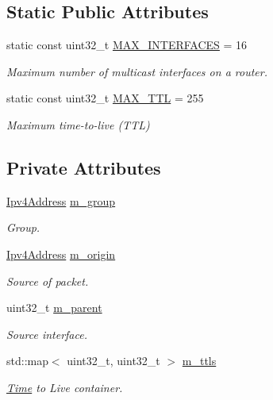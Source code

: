 \subsection*{Static Public Attributes}
\begin{DoxyCompactItemize}
\item 
static const uint32\+\_\+t \hyperlink{classns3_1_1Ipv4MulticastRoute_a9695fa6d0caa266aa4ab3b5cd2d86267}{M\+A\+X\+\_\+\+I\+N\+T\+E\+R\+F\+A\+C\+ES} = 16
\begin{DoxyCompactList}\small\item\em Maximum number of multicast interfaces on a router. \end{DoxyCompactList}\item 
static const uint32\+\_\+t \hyperlink{classns3_1_1Ipv4MulticastRoute_ab7118310b9ac11a437788db9c1250412}{M\+A\+X\+\_\+\+T\+TL} = 255
\begin{DoxyCompactList}\small\item\em Maximum time-\/to-\/live (T\+TL) \end{DoxyCompactList}\end{DoxyCompactItemize}
\subsection*{Private Attributes}
\begin{DoxyCompactItemize}
\item 
\hyperlink{classns3_1_1Ipv4Address}{Ipv4\+Address} \hyperlink{classns3_1_1Ipv4MulticastRoute_a1eff91a957a155f30f907dd41fcdd1a2}{m\+\_\+group}
\begin{DoxyCompactList}\small\item\em Group. \end{DoxyCompactList}\item 
\hyperlink{classns3_1_1Ipv4Address}{Ipv4\+Address} \hyperlink{classns3_1_1Ipv4MulticastRoute_a86aaae8111723a94b51f3bbff7bb16d1}{m\+\_\+origin}
\begin{DoxyCompactList}\small\item\em Source of packet. \end{DoxyCompactList}\item 
uint32\+\_\+t \hyperlink{classns3_1_1Ipv4MulticastRoute_a9cda8824d64903a9b43675d008285499}{m\+\_\+parent}
\begin{DoxyCompactList}\small\item\em Source interface. \end{DoxyCompactList}\item 
std\+::map$<$ uint32\+\_\+t, uint32\+\_\+t $>$ \hyperlink{classns3_1_1Ipv4MulticastRoute_ac56c7c5c768e34463652476f262b8b70}{m\+\_\+ttls}
\begin{DoxyCompactList}\small\item\em \hyperlink{classns3_1_1Time}{Time} to Live container. \end{DoxyCompactList}\end{DoxyCompactItemize}
